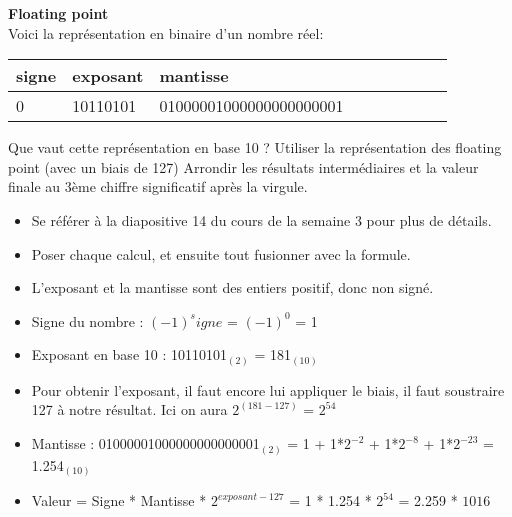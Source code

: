 \begin{Exercice}[15 minutes] \textbf{Floating point}\\
    
    Voici la représentation en binaire d'un nombre réel: \\
    
     \begin{tabular}{| p{1cm} | p{3cm} | p{9.5cm} | p{1cm} | p{1cm} | p{1cm} | p{1cm} | p{1cm} | p{1cm} |} 
            \hline
            signe & exposant & mantisse \\ [0.5ex] 
            \hline
            0 & 10110101 & 01000001000000000000001 \\ [0.5ex]
            \hline
	\end{tabular}
	
	Que vaut cette représentation en base 10 ? Utiliser la représentation des floating point (avec un biais de 127) Arrondir les résultats intermédiaires et la valeur finale au 3ème chiffre significatif après la virgule. \\
	
    \begin{conseil}
    
    \begin{itemize}
    	\item Se référer à la diapositive 14 du cours de la semaine 3 pour plus de détails.
    	\item Poser chaque calcul, et ensuite tout fusionner avec la formule.
    	\item L'exposant et la mantisse sont des entiers positif, donc non signé.
    \end{itemize}
    
    \end{conseil}
    
    \begin{solution}
        \begin{itemize}
        	\item Signe du nombre : $(-1)^signe$ = $(-1)^0$ = 1
        	\item Exposant en base 10 : 10110101$_{(2)}$ = 181$_{(10)}$
        	\item Pour obtenir l'exposant, il faut encore lui appliquer le biais, il faut soustraire 127 à notre résultat. Ici on aura $2^{(181-127)}$ = $2^{54}$
        	\item Mantisse : 01000001000000000000001$_{(2)}$ = 1 + 1*$2^{-2}$ + 1*$2^{-8}$ + 1*$2^{-23}$ = 1.254$_{(10)}$
        	\item Valeur = Signe * Mantisse * $2^{exposant-127}$ = 1 * 1.254 * $2^{54}$ = 2.259 * $10{16}$
        \end{itemize}
    \end{solution}
\end{Exercice}

